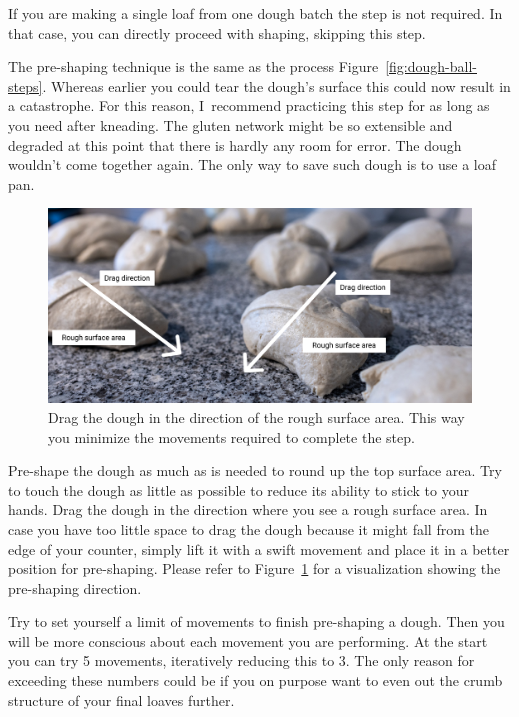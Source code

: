 If you are making a single loaf from one dough batch the step is not required.
In that case, you can directly proceed with shaping, skipping this step.

The pre-shaping technique is the same as the process
Figure~\ref{fig:dough-ball-steps}.  Whereas earlier you could tear the dough's
surface this could now result in a catastrophe.  For this reason, I~recommend
practicing this step for as long as you need after kneading.  The gluten
network might be so extensible and degraded at this point that there is hardly
any room for error. The dough wouldn't come together again. The only way to
save such dough is to use a loaf pan.

\begin{figure}[!htb]
  \centering
  \includegraphics[width=\textwidth]{preshape-direction}
  \caption[Dragging direction]{Drag the dough in the direction of the rough
      surface area. This way you minimize the movements required to complete
      the step.}%
  \label{fig:preshape-direction}
\end{figure}

Pre-shape the dough as much as is needed to round up the top surface area. Try
to touch the dough as little as possible to reduce its ability to stick to
your hands. Drag the dough in the direction where you see a rough surface
area. In case you have too little space to drag the dough because it might
fall from the edge of your counter, simply lift it with a swift movement and
place it in a better position for pre-shaping. Please refer to
Figure~\ref{fig:preshape-direction} for a visualization showing the
pre-shaping direction.

Try to set yourself a limit of movements to finish pre-shaping
a dough. Then you will be more conscious about each movement
you are performing. At the start you can try 5 movements,
iteratively reducing this to 3. The only reason for exceeding these
numbers could be if you on purpose want to even out the crumb
structure of your final loaves further.

